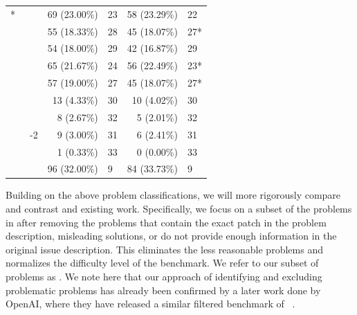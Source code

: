 \begin{table}[h]
{\begin{tabular}{ll|rlrl}
\cellcolor[HTML]{e1ecff}\multirow{1}*{\sweagent{}~\cite{sweagent}} & \cellcolor[HTML]{e1ecff}\anthropic{} \claudesonnet{} & \cellcolor[HTML]{e1ecff}69 (23.00\%) & \cellcolor[HTML]{e1ecff}23 & \cellcolor[HTML]{e1ecff}58 (23.29\%) &\cellcolor[HTML]{e1ecff}22\\
\cellcolor[HTML]{e1ecff} & \cellcolor[HTML]{e1ecff}\openai{} \gptfouro{} & \cellcolor[HTML]{e1ecff}55 (18.33\%) & \cellcolor[HTML]{e1ecff}28 & \cellcolor[HTML]{e1ecff}45 (18.07\%) &\cellcolor[HTML]{e1ecff}27*\\
\cellcolor[HTML]{e1ecff} & \cellcolor[HTML]{e1ecff}\openai{} \gptfour{} & \cellcolor[HTML]{e1ecff}54 (18.00\%) & \cellcolor[HTML]{e1ecff}29 & \cellcolor[HTML]{e1ecff}42 (16.87\%) &\cellcolor[HTML]{e1ecff}29\\
\appmapnavie{}~\cite{appmapnavie} & \openai{} \gptfouro{} & 65 (21.67\%) & 24 & 56 (22.49\%) &23*\\
\cellcolor[HTML]{e1ecff}\autocoderover{}~\cite{autocoderover} & \cellcolor[HTML]{e1ecff}\openai{} \gptfour{} & \cellcolor[HTML]{e1ecff}57 (19.00\%) & \cellcolor[HTML]{e1ecff}27 & \cellcolor[HTML]{e1ecff}45 (18.07\%) &\cellcolor[HTML]{e1ecff}27*\\
\midrule
\rag{}~\cite{sweagent} & \anthropic{} \claudeopus{} & 13 (4.33\%) & 30 & 10 (4.02\%) &30\\
 & \openai{} \gptfour{} & 8 (2.67\%) & 32 & 5 (2.01\%) &32\\
 & \anthropic{} \claude{}-2 & 9 (3.00\%) & 31 & 6 (2.41\%) &31\\
 & \openai{} \chatgpt{} & 1 (0.33\%) & 33 & 0 (0.00\%) &33\\
 \midrule
\cellcolor[HTML]{e1ecff}\textbf{\tech{}} & \cellcolor[HTML]{e1ecff}\openai{} \gptfouro{} & \cellcolor[HTML]{e1ecff}96 (32.00\%) & \cellcolor[HTML]{e1ecff}9 & \cellcolor[HTML]{e1ecff}84 (33.73\%) &\cellcolor[HTML]{e1ecff}9\\


\bottomrule
\end{tabular}
}
\end{table}

Building on the above problem classifications, we will more rigorously compare and contrast \tech and existing work. 
Specifically, we focus on a subset of the problems in \swebenchlite after removing the problems that contain the exact patch in the problem description, misleading solutions, or do not provide enough information in the original issue description.  
This eliminates the less reasonable problems and normalizes the difficulty level of the benchmark. 
We refer to our subset of \sanitizedtotalproblem{} problems as \swebenchlitefiltered{}. 
We note here that our approach of identifying and excluding problematic problems has already been confirmed by a later work done by OpenAI, where they have released a similar filtered benchmark of \swebenchverified~\cite{openaiverified}.  






